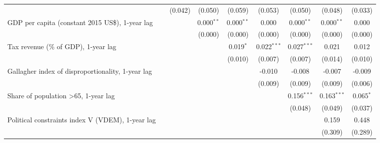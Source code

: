 \begin{table}[htbp]
\begin{tabular}{lcccccccc}
                                                                               &               & (0.042)       & (0.050)        & (0.059)      & (0.053)       & (0.050)       & (0.048)       & (0.033)\\   
      GDP per capita (constant 2015 US\$), 1-year lag                          &               &               & 0.000$^{**}$   & 0.000$^{**}$ & 0.000         & 0.000$^{**}$  & 0.000$^{**}$  & 0.000\\   
                                                                               &               &               & (0.000)        & (0.000)      & (0.000)       & (0.000)       & (0.000)       & (0.000)\\   
      Tax revenue (\% of GDP), 1-year lag                                      &               &               &                & 0.019$^{*}$  & 0.022$^{***}$ & 0.027$^{***}$ & 0.021         & 0.012\\   
                                                                               &               &               &                & (0.010)      & (0.007)       & (0.007)       & (0.014)       & (0.010)\\   
      Gallagher index of disproportionality, 1-year lag                        &               &               &                &              & -0.010        & -0.008        & -0.007        & -0.009\\   
                                                                               &               &               &                &              & (0.009)       & (0.009)       & (0.009)       & (0.006)\\   
      Share of population >65, 1-year lag                                      &               &               &                &              &               & 0.156$^{***}$ & 0.163$^{***}$ & 0.065$^{*}$\\   
                                                                               &               &               &                &              &               & (0.048)       & (0.049)       & (0.037)\\   
      Political constraints index V (VDEM), 1-year lag                         &               &               &                &              &               &               & 0.159         & 0.448\\   
                                                                               &               &               &                &              &               &               & (0.309)       & (0.289)\\   

\end{tabular}
\end{table}
